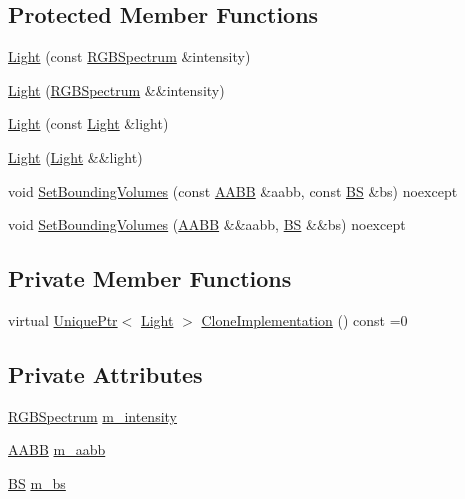 \subsection*{Protected Member Functions}
\begin{DoxyCompactItemize}
\item 
\hyperlink{classmage_1_1_light_ab470ad4bde2c1e27068541bb53accb0c}{Light} (const \hyperlink{structmage_1_1_r_g_b_spectrum}{R\+G\+B\+Spectrum} \&intensity)
\item 
\hyperlink{classmage_1_1_light_aae4b7899b7709f658d0d061909e45cec}{Light} (\hyperlink{structmage_1_1_r_g_b_spectrum}{R\+G\+B\+Spectrum} \&\&intensity)
\item 
\hyperlink{classmage_1_1_light_aa91ba3fde50487939d99252c73f732cc}{Light} (const \hyperlink{classmage_1_1_light}{Light} \&light)
\item 
\hyperlink{classmage_1_1_light_a75343c11264fa27c4f166caaf0fec880}{Light} (\hyperlink{classmage_1_1_light}{Light} \&\&light)
\item 
void \hyperlink{classmage_1_1_light_aa4ec2f7e3e42804aad415a03075c4b39}{Set\+Bounding\+Volumes} (const \hyperlink{structmage_1_1_a_a_b_b}{A\+A\+BB} \&aabb, const \hyperlink{structmage_1_1_b_s}{BS} \&bs) noexcept
\item 
void \hyperlink{classmage_1_1_light_a8ca9ffda51c5f32eb940680ceb795f0f}{Set\+Bounding\+Volumes} (\hyperlink{structmage_1_1_a_a_b_b}{A\+A\+BB} \&\&aabb, \hyperlink{structmage_1_1_b_s}{BS} \&\&bs) noexcept
\end{DoxyCompactItemize}
\subsection*{Private Member Functions}
\begin{DoxyCompactItemize}
\item 
virtual \hyperlink{namespacemage_a3316d7143a973e37adf1110f2e80ca31}{Unique\+Ptr}$<$ \hyperlink{classmage_1_1_light}{Light} $>$ \hyperlink{classmage_1_1_light_aa613d76a1ebda69efde853d15f75490c}{Clone\+Implementation} () const =0
\end{DoxyCompactItemize}
\subsection*{Private Attributes}
\begin{DoxyCompactItemize}
\item 
\hyperlink{structmage_1_1_r_g_b_spectrum}{R\+G\+B\+Spectrum} \hyperlink{classmage_1_1_light_a4ed8d43c8a4df71671a922d5f04974b8}{m\+\_\+intensity}
\item 
\hyperlink{structmage_1_1_a_a_b_b}{A\+A\+BB} \hyperlink{classmage_1_1_light_a2c9190a763a1f37f7639a02bef01279d}{m\+\_\+aabb}
\item 
\hyperlink{structmage_1_1_b_s}{BS} \hyperlink{classmage_1_1_light_a926df9e12442c630d252fae852b8fc57}{m\+\_\+bs}
\end{DoxyCompactItemize}


